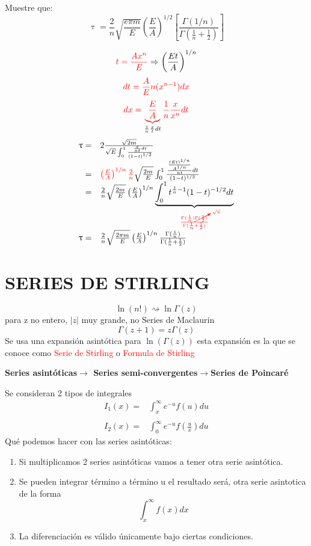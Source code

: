 \documentclass{article}
\theoremstyle{definition}
\begin{document}
Muestre que:
\[\uptau=\frac{2}{n}\sqrt{\frac{e\pi m}{E}}\left(\frac{E}{A}\right)^{1/2}\left[\frac{\Gamma (1/n)}{\Gamma (\frac{1}{n}+\frac{1}{2})}\right]\]
\begin{center}
\end{center}
\[\textcolor{red}{t=\frac{Ax^n}{E}}\Rightarrow \left(\frac{Et}{A}\right)^{1/n}\]
\[\textcolor{red}{dt=\frac{A}{E}n(x^{n-1})dx}\]
\[\textcolor{red}{dx=\underbrace{\frac{E}{A}}_{\textcolor{black}{\frac{1}{n}\frac{x}{t}dt}}\frac{1}{n}\frac{x}{x^n}dt}\]
\[
\begin{array}{rl}
	\uptau =& 2\frac{\sqrt{2m}}{\sqrt{E}\int^1_0\frac{\frac{x}{nt}dt}{(1-t)^{1/2}}}\\
	=&\textcolor{red}{\left(\frac{E}{A}\right)^{1/n}\frac{2}{n}}\sqrt{\frac{2m}{E}}\int^1_0\frac{\frac{\frac{(Et)^{1/n}}{A^{1/n}}}{nt}dt}{(1-t)^{1/2}}\\
	=&\frac{2}{n}\sqrt{\frac{2m}{E}}\left(\frac{E}{A}\right)^{1/n}\underbrace{\int^1_0t^{\frac{1}{n}-1}(1-t)^{-1/2}dt}_{\textcolor{red}{\frac{\Gamma (\frac{1}{n}) \cancelto{\sqrt{\pi}}{\Gamma (\frac{1}{2})}}{\Gamma (\frac{1}{n}+\frac{1}{2})}}}\\
	\uptau =& \frac{2}{n}\sqrt{\frac{2\pi m}{E}}\left(\frac{E}{A}\right)^{1/n}\frac{\Gamma (\frac{1}{n})}{\Gamma (\frac{1}{n}+\frac{1}{2})}
\end{array}
\]
\section{SERIES DE STIRLING}
\[\ln (n!)\rightsquigarrow \ln \Gamma (z)\]
para z no entero, $|z|$ muy grande, no Series de Maclaurin
\[\Gamma (z+1)=z\Gamma (z)\]
Se usa una expansión asintótica para $\ln (\Gamma (z))$ esta expansión es la que se conoce como \textcolor{red}{Serie de Stirling} o \textcolor{red}{Formula de Stirling}

\textbf{Series asintóticas$\to$ Series semi-convergentes$\to$Series de Poincaré}

Se consideran 2 tipos de integrales 
\[
\begin{array}{rl}
	I_1 (x)=& \int^{\infty}_xe^{-u}f(u)du\\
	\\
	I_2 (x)=& \int^{\infty}_0e^{-u}f\left(\frac{u}{x}\right)du
\end{array}
\]
Qué podemos hacer con las series asintóticas:
\begin{enumerate}
	\item Si multiplicamos 2 series asintóticas vamos a tener otra serie asintótica.
	\item Se pueden integrar término a término u el resultado será, otra serie asintotica de la forma
	\[\int^{\infty}_xf(x)dx\]
	\item La diferenciación es válido únicamente bajo ciertas condiciones.
\end{enumerate}
\end{document}
